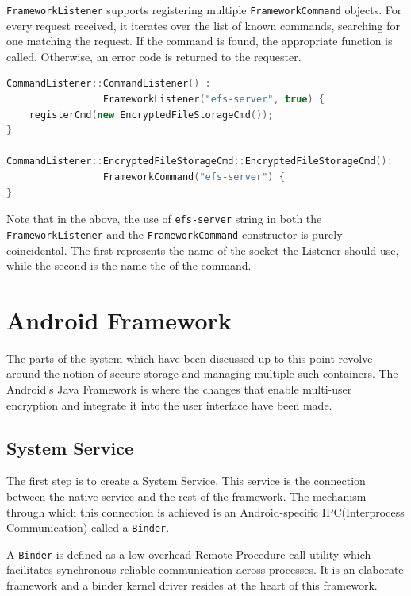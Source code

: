 \texttt{FrameworkListener} supports registering multiple \texttt{FrameworkCommand} objects. For every request received, it iterates over the list of known commands, searching for one matching the request. If the command is found, the appropriate function is called. Otherwise, an error code is returned to the requester.
\newpage

\begin{lstlisting}[language=C++, caption=Command Listener Initialization, label=lst:cmd-init]
CommandListener::CommandListener() :
                 FrameworkListener("efs-server", true) {
    registerCmd(new EncryptedFileStorageCmd());
}

CommandListener::EncryptedFileStorageCmd::EncryptedFileStorageCmd():
                 FrameworkCommand("efs-server") {
}
\end{lstlisting}

Note that in the above, the use of \texttt{efs-server} string in both the \texttt{FrameworkListener} and the \texttt{FrameworkCommand} constructor is purely coincidental. The first represents the name of the socket the Listener should use, while the second is the name the of the command.

\section{Android Framework}
\label{sec:android-frmwrk-multi-user}

The parts of the system which have been discussed up to this point revolve around the notion of secure storage and managing multiple such containers. The Android's Java Framework is where the changes that enable multi-user encryption and integrate it into the user interface have been made.

\subsection{System Service}
\label{sub-sec:system-service-multi-user}

The first step is to create a System Service. This service is the connection between the native service and the rest of the framework. The mechanism through which this connection is achieved is an Android-specific IPC(Interprocess Communication) called a \texttt{Binder}.

A \texttt{Binder} is defined as a low overhead Remote Procedure call utility which facilitates synchronous reliable communication across processes. It is an elaborate framework and a binder kernel driver resides at the heart of this framework.

